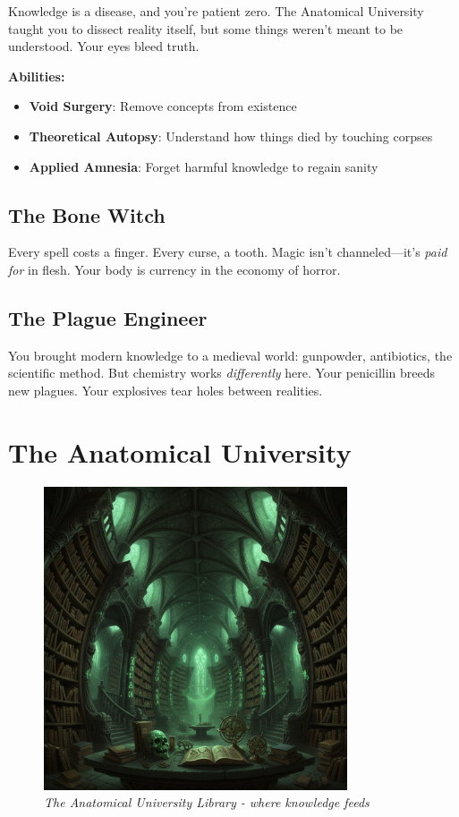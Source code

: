 \documentclass[11pt,a4paper,twoside]{book}
\begin{document}
Knowledge is a disease, and you're patient zero. The Anatomical University taught you to dissect reality itself, but some things weren't meant to be understood. Your eyes bleed truth.

\textbf{Abilities:}
\begin{itemize}
    \item \textbf{Void Surgery}: Remove concepts from existence
    \item \textbf{Theoretical Autopsy}: Understand how things died by touching corpses
    \item \textbf{Applied Amnesia}: Forget harmful knowledge to regain sanity
\end{itemize}

\subsection{The Bone Witch}

Every spell costs a finger. Every curse, a tooth. Magic isn't channeled—it's \textit{paid for} in flesh. Your body is currency in the economy of horror.

\subsection{The Plague Engineer}

You brought modern knowledge to a medieval world: gunpowder, antibiotics, the scientific method. But chemistry works \textit{differently} here. Your penicillin breeds new plagues. Your explosives tear holes between realities.

\section{The Anatomical University}

\begin{figure}[h]
\centering
\includegraphics[width=0.8\textwidth]{images/anatomical_university_library_2025-09-03T22-30-07-255Z_1.png}
\caption*{\textit{The Anatomical University Library - where knowledge feeds}}
\end{figure}
\end{document}
